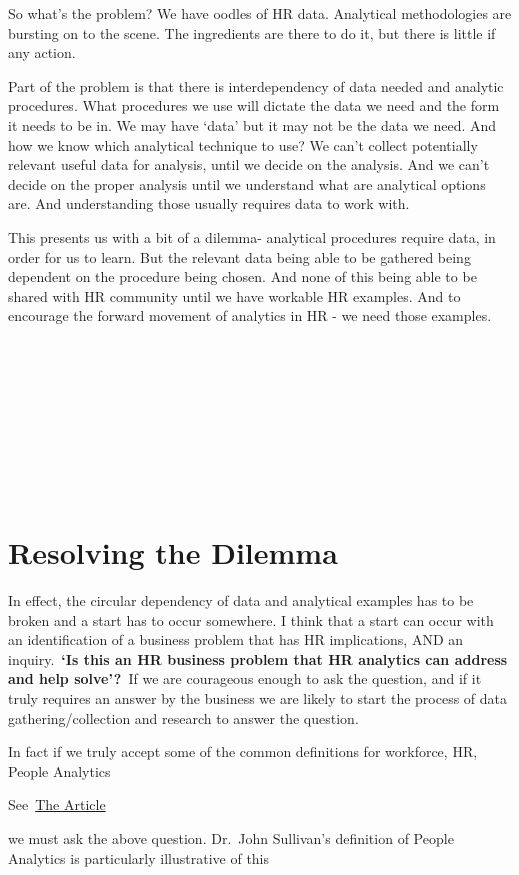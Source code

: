 \documentclass[
]{article}
\begin{document}
So what's the problem? We have oodles of HR data. Analytical
methodologies are bursting on to the scene. The ingredients are there to
do it, but there is little if any action.

Part of the problem is that there is interdependency of data needed and
analytic procedures. What procedures we use will dictate the data we
need and the form it needs to be in. We may have `data' but it may not
be the data we need. And how we know which analytical technique to use?
We can't collect potentially relevant useful data for analysis, until we
decide on the analysis. And we can't decide on the proper analysis until
we understand what are analytical options are. And understanding those
usually requires data to work with.

This presents us with a bit of a dilemma- analytical procedures require
data, in order for us to learn. But the relevant data being able to be
gathered being dependent on the procedure being chosen. And none of this
being able to be shared with HR community until we have workable HR
examples. And to encourage the forward movement of analytics in HR - we
need those examples.

~

~

~

~

~

\section{Resolving the Dilemma}\label{resolving-the-dilemma}

In effect, the circular dependency of data and analytical examples has
to be broken and a start has to occur somewhere. I think that a start
can occur with an identification of a business problem that has HR
implications, AND an inquiry.~\textbf{`Is this an HR business problem
that HR analytics can address and help solve'?}~If we are courageous
enough to ask the question, and if it truly requires an answer by the
business we are likely to start the process of data gathering/collection
and research to answer the question.

In fact if we truly accept some of the common definitions for workforce,
HR, People Analytics

See~\href{https://www.linkedin.com/pulse/workforcehrpeople-analytics-hr-lyndon?trk=mp-reader-card}{The Article}

we must ask the above question. Dr.~John Sullivan's definition of People
Analytics is particularly illustrative of this
\end{document}
